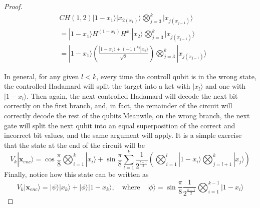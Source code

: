 \documentclass{article}
\theoremstyle{definition}
\newcommand{\ket}[1]{|#1\rangle}
\begin{document}
\begin{proof}
\begin{eqnarray}
&CH(1,2)\ket{1-x_1}\ket{x_{2(x_1)}}\bigotimes_{j=3}^k\ket{x_{j(x_{j-1})}}\\
&=\ket{1-x_1}H^{(1-x_1)}H^{x_1}\ket{x_2}\bigotimes_{j=3}^k\ket{x_{j(x_{j-1})}}\\
&=\ket{1-x_1}\left(\frac{\ket{1-x_2}+(-1)^{x_2}\ket{x_2}}{\sqrt2}\right)\bigotimes_{j=3}^k\ket{x_{j(x_{j-1})}}
\end{eqnarray}

In general, for any given $l<k$, every time the controll qubit is in the wrong state, the controlled Hadamard will split the target into a ket with $\ket{x_l}$ and one with $\ket{1-x_l}$. Then again, the next controlled Hadamard will decode the next bit correctly on the first branch, and, in fact, the remainder of the circuit will correctly decode the rest of the qubits.Meanwile, on the wrong branch, the next gate will split the next qubit into an equal superposition of the correct and incorrect bit values, and the same argument will apply. It is a simple exercise that the state at the end of the circuit will be
\begin{equation}
V_k\ket{\textbf{x}_{enc}}=\cos\frac{\pi}{8}\bigotimes_{i=1}^k\ket{x_i}+\sin\frac{\pi}{8}\sum_{l=1}^k\frac{1}{2^{\frac{l-1}{2}}}\left(\bigotimes_{i=1}^l\ket{1-x_i}\bigotimes_{j=l+1}^k\ket{x_j}\right)
\end{equation}
Finally, notice how this state can be written as
\[V_k\ket{\textbf{x}_{enc}}=\ket{\psi}\ket{x_k}+\ket{\phi}\ket{1-x_k},\quad \text{where} \quad \ket{\phi}=\sin\frac{\pi}{8}\frac{1}{2^{\frac{k-1}{2}}}\bigotimes_{i=1}^{k-1}\ket{1-x_i}\]

\end{proof}
\end{document}
